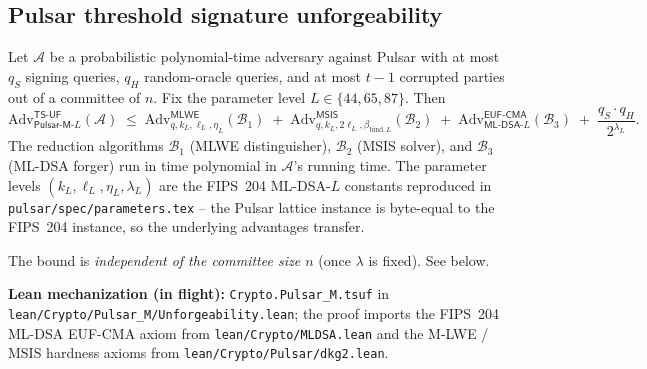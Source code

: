 
\subsection*{Pulsar threshold signature unforgeability}

\begin{theorem}
\label{thm:pulsar-tsuf}
Let $\mathcal{A}$ be a probabilistic polynomial-time adversary against
Pulsar with at most $q_S$ signing queries, $q_H$ random-oracle
queries, and at most $t-1$ corrupted parties out of a committee of
$n$. Fix the parameter level $L \in \{44, 65, 87\}$. Then
\[
  \mathrm{Adv}^{\mathsf{TS\text{-}UF}}_{\mathsf{Pulsar\text{-}M}\text{-}L}(\mathcal{A})
  \;\leq\;
  \mathrm{Adv}^{\mathsf{MLWE}}_{q, k_L, \ell_L, \eta_L}(\mathcal{B}_1)
  \;+\;
  \mathrm{Adv}^{\mathsf{MSIS}}_{q, k_L, 2\ell_L, \beta_{\mathrm{bind}, L}}(\mathcal{B}_2)
  \;+\;
  \mathrm{Adv}^{\mathsf{EUF\text{-}CMA}}_{\mathsf{ML\text{-}DSA}\text{-}L}(\mathcal{B}_3)
  \;+\;
  \frac{q_S \cdot q_H}{2^{\lambda_L}}.
\]
The reduction algorithms $\mathcal{B}_1$ (MLWE distinguisher),
$\mathcal{B}_2$ (MSIS solver), and $\mathcal{B}_3$ (ML-DSA forger)
run in time polynomial in $\mathcal{A}$'s running time. The parameter
levels $(k_L, \ell_L, \eta_L, \lambda_L)$ are the FIPS~204 ML-DSA-$L$
constants reproduced in \texttt{pulsar/spec/parameters.tex} -- the
Pulsar lattice instance is byte-equal to the FIPS~204 instance, so
the underlying advantages transfer.

The bound is \emph{independent of the committee size $n$} (once
$\lambda$ is fixed). See  below.
\end{theorem}

\textbf{Lean mechanization (in flight):}
\texttt{Crypto.Pulsar\_M.tsuf} in
\texttt{lean/Crypto/Pulsar\_M/Unforgeability.lean}; the proof
imports the FIPS~204 ML-DSA EUF-CMA axiom from
\texttt{lean/Crypto/MLDSA.lean} and the M-LWE / MSIS hardness axioms
from \texttt{lean/Crypto/Pulsar/dkg2.lean}.

